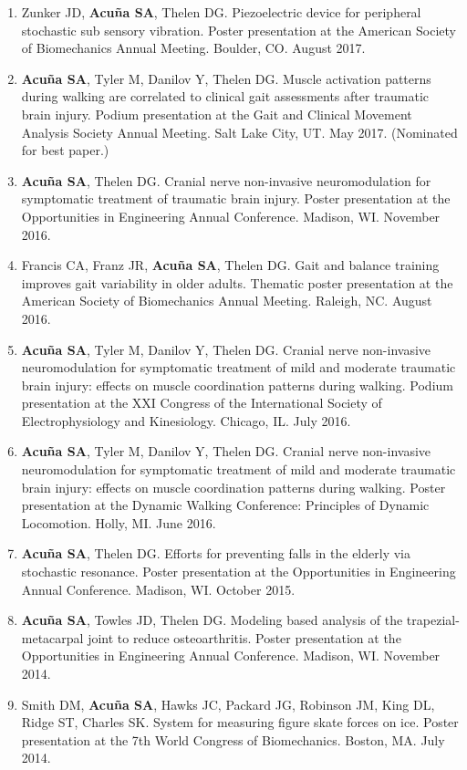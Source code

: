 \documentclass[letterpaper, 10pt]{article}
\begin{document}
\begin{enumerate}
    \item Zunker JD, \textbf{Acuña SA}, Thelen DG. Piezoelectric device for peripheral stochastic sub sensory vibration. Poster presentation at the American Society of Biomechanics Annual Meeting. Boulder, CO. August 2017.
    \item \textbf{Acuña SA}, Tyler M, Danilov Y, Thelen DG. Muscle activation patterns during walking are correlated to clinical gait assessments after traumatic brain injury. Podium presentation at the Gait and Clinical Movement Analysis Society Annual Meeting. Salt Lake City, UT. May 2017. (Nominated for best paper.)
    \item \textbf{Acuña SA}, Thelen DG. Cranial nerve non-invasive neuromodulation for symptomatic treatment of traumatic brain injury. Poster presentation at the Opportunities in Engineering Annual Conference. Madison, WI. November 2016.
    \item Francis CA, Franz JR, \textbf{Acuña SA}, Thelen DG. Gait and balance training improves gait variability in older adults. Thematic poster presentation at the American Society of Biomechanics Annual Meeting. Raleigh, NC. August 2016.
    \item \textbf{Acuña SA}, Tyler M, Danilov Y, Thelen DG. Cranial nerve non-invasive neuromodulation for symptomatic treatment of mild and moderate traumatic brain injury: effects on muscle coordination patterns during walking. Podium presentation at the XXI Congress of the International Society of Electrophysiology and Kinesiology. Chicago, IL. July 2016.
    \item \textbf{Acuña SA}, Tyler M, Danilov Y, Thelen DG. Cranial nerve non-invasive neuromodulation for symptomatic treatment of mild and moderate traumatic brain injury: effects on muscle coordination patterns during walking. Poster presentation at the Dynamic Walking Conference: Principles of Dynamic Locomotion. Holly, MI. June 2016.
    \item \textbf{Acuña SA}, Thelen DG. Efforts for preventing falls in the elderly via stochastic resonance. Poster presentation at the Opportunities in Engineering Annual Conference. Madison, WI. October 2015.
    \item \textbf{Acuña SA}, Towles JD, Thelen DG. Modeling based analysis of the trapezial-metacarpal joint to reduce osteoarthritis. Poster presentation at the Opportunities in Engineering Annual Conference. Madison, WI. November 2014.
    \item Smith DM, \textbf{Acuña SA}, Hawks JC, Packard JG, Robinson JM, King DL, Ridge ST, Charles SK. System for measuring ﬁgure skate forces on ice. Poster presentation at the 7th World Congress of Biomechanics. Boston, MA. July 2014.
    

\end{enumerate}
\end{document}
